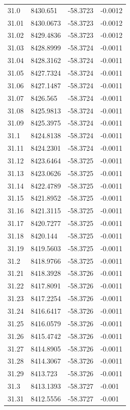 \begin{table}[H]
\begin{tabular}{llll}
31.0 & 8430.651 & -58.3723 & -0.0012 \\
31.01 & 8430.0673 & -58.3723 & -0.0012 \\
31.02 & 8429.4836 & -58.3723 & -0.0012 \\
31.03 & 8428.8999 & -58.3724 & -0.0011 \\
31.04 & 8428.3162 & -58.3724 & -0.0011 \\
31.05 & 8427.7324 & -58.3724 & -0.0011 \\
31.06 & 8427.1487 & -58.3724 & -0.0011 \\
31.07 & 8426.565 & -58.3724 & -0.0011 \\
31.08 & 8425.9813 & -58.3724 & -0.0011 \\
31.09 & 8425.3975 & -58.3724 & -0.0011 \\
31.1 & 8424.8138 & -58.3724 & -0.0011 \\
31.11 & 8424.2301 & -58.3724 & -0.0011 \\
31.12 & 8423.6464 & -58.3725 & -0.0011 \\
31.13 & 8423.0626 & -58.3725 & -0.0011 \\
31.14 & 8422.4789 & -58.3725 & -0.0011 \\
31.15 & 8421.8952 & -58.3725 & -0.0011 \\
31.16 & 8421.3115 & -58.3725 & -0.0011 \\
31.17 & 8420.7277 & -58.3725 & -0.0011 \\
31.18 & 8420.144 & -58.3725 & -0.0011 \\
31.19 & 8419.5603 & -58.3725 & -0.0011 \\
31.2 & 8418.9766 & -58.3725 & -0.0011 \\
31.21 & 8418.3928 & -58.3726 & -0.0011 \\
31.22 & 8417.8091 & -58.3726 & -0.0011 \\
31.23 & 8417.2254 & -58.3726 & -0.0011 \\
31.24 & 8416.6417 & -58.3726 & -0.0011 \\
31.25 & 8416.0579 & -58.3726 & -0.0011 \\
31.26 & 8415.4742 & -58.3726 & -0.0011 \\
31.27 & 8414.8905 & -58.3726 & -0.0011 \\
31.28 & 8414.3067 & -58.3726 & -0.0011 \\
31.29 & 8413.723 & -58.3726 & -0.0011 \\
31.3 & 8413.1393 & -58.3727 & -0.001 \\
31.31 & 8412.5556 & -58.3727 & -0.001 \\

\end{tabular}
\end{table}
